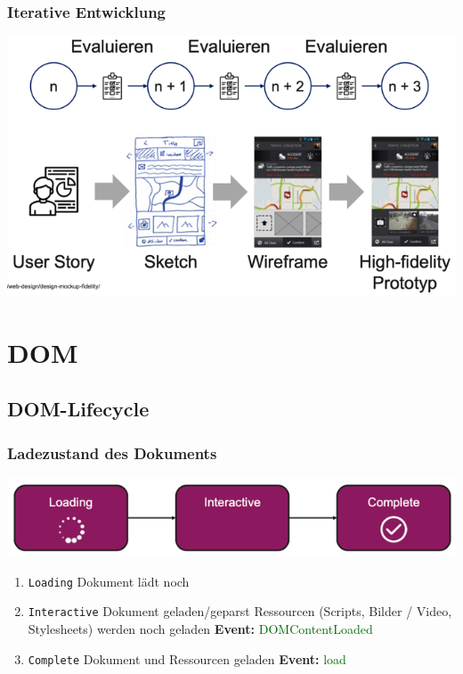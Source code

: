 \documentclass[a4paper, landscape, 8pt]{scrartcl}
\begin{document}
\begin{multicols*}{4}
        \subsubsection{Iterative Entwicklung}
        \includegraphics[width=\columnwidth]{graphic/17-iterative-entwicklung}

        \section{DOM}
        \subsection{DOM-Lifecycle}
        \subsubsection{Ladezustand des Dokuments}
        \includegraphics[scale=0.22]{graphic/04-ladezustand-dom}
        \begin{enumerate}
            \item \texttt{Loading}
            \subitem Dokument lädt noch
            \item \texttt{Interactive}
            \subitem Dokument geladen/geparst
            \subitem Ressourcen (Scripts, Bilder / Video, Stylesheets) werden noch geladen
            \subitem \textbf{Event:} \textcolor{darkgreen}{DOMContentLoaded}
            \item \texttt{Complete}
            \subitem Dokument und Ressourcen geladen
            \subitem \textbf{Event:} \textcolor{darkgreen}{load}
        \end{enumerate}


\end{multicols*}
\end{document}
